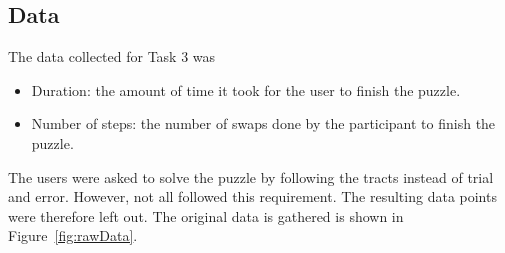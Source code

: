 \documentclass[hyperref, plainreport, noproblem]{cgvpub1}
\begin{document}
\subsection{Data}

The data collected for Task 3 was 
\begin{itemize}
	\item Duration: the amount of time it took for the user to finish the puzzle.
	\item Number of steps: the number of swaps done by the participant to finish the puzzle.
\end{itemize}
The users were asked to solve the puzzle by following the tracts instead of trial and error. However, not all followed this requirement. The resulting data points were therefore left out. The original data is gathered is shown in Figure~\ref{fig:rawData}.



\end{document}

